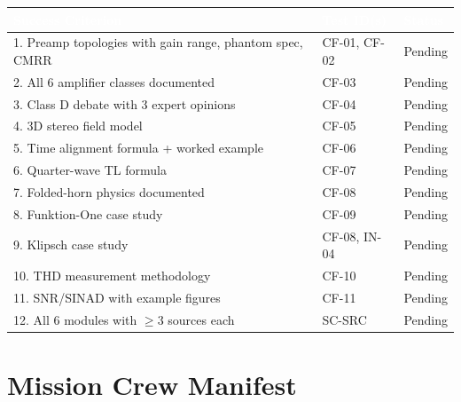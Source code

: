 \documentclass[11pt,letterpaper]{article}
\newcommand{\tableheader}[1]{\textbf{\sffamily\textcolor{white}{#1}}}
\begin{document}
\begin{center}
\begin{tabularx}{\textwidth}{XL{3.5cm}C{1.5cm}}
\toprule
{}
\tableheader{Success Criterion} & \tableheader{Test ID(s)} & \tableheader{Status} \\
. Preamp topologies with gain range, phantom spec, CMRR & CF-01, CF-02 & Pending \\
2. All 6 amplifier classes documented & CF-03 & Pending \\
3. Class D debate with 3 expert opinions & CF-04 & Pending \\
4. 3D stereo field model & CF-05 & Pending \\
5. Time alignment formula + worked example & CF-06 & Pending \\
6. Quarter-wave TL formula & CF-07 & Pending \\
7. Folded-horn physics documented & CF-08 & Pending \\
8. Funktion-One case study & CF-09 & Pending \\
9. Klipsch case study & CF-08, IN-04 & Pending \\
10. THD measurement methodology & CF-10 & Pending \\
11. SNR/SINAD with example figures & CF-11 & Pending \\
12. All 6 modules with $\geq$3 sources each & SC-SRC & Pending \\
\bottomrule
\end{tabularx}
\end{center}

\section{Mission Crew Manifest}
\end{document}
